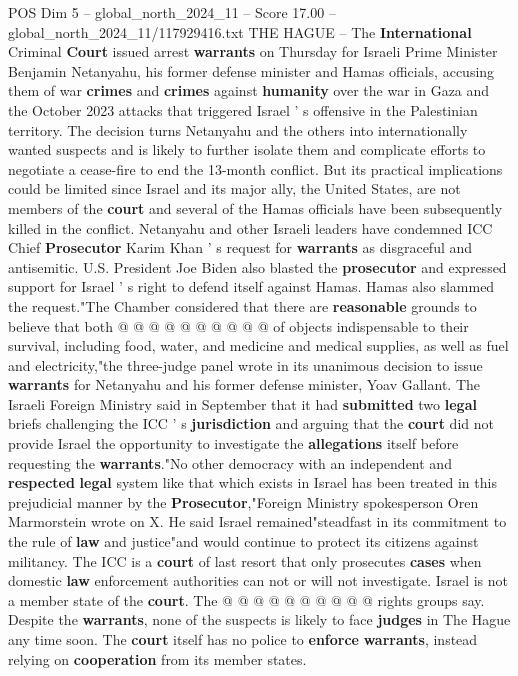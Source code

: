 \begin{textsample}{POS Dim 5 – global\_north\_2024\_11 – Score 17.00 – global\_north\_2024\_11/117929416.txt}  \label{ex:f5_pos_039}
THE HAGUE -- The \textbf{International} Criminal \textbf{Court} issued arrest \textbf{warrants} on Thursday for Israeli Prime Minister Benjamin Netanyahu, his former defense minister and Hamas officials, accusing them of war \textbf{crimes} and \textbf{crimes} against \textbf{humanity} over the war in Gaza and the October 2023 attacks that triggered Israel ' s offensive in the Palestinian territory.
The decision turns Netanyahu and the others into internationally wanted suspects and is likely to further isolate them and complicate efforts to negotiate a cease-fire to end the 13-month conflict.
But its practical implications could be limited since Israel and its major ally, the United States, are not members of the \textbf{court} and several of the Hamas officials have been subsequently killed in the conflict.
Netanyahu and other Israeli leaders have condemned ICC Chief \textbf{Prosecutor} Karim Khan ' s request for \textbf{warrants} as disgraceful and antisemitic.
U.S.
President Joe Biden also blasted the \textbf{prosecutor} and expressed support for Israel ' s right to defend itself against Hamas.
Hamas also slammed the request."The Chamber considered that there are \textbf{reasonable} grounds to believe that both @ @ @ @ @ @ @ @ @ @ of objects indispensable to their survival, including food, water, and medicine and medical supplies, as well as fuel and electricity,"the three-judge panel wrote in its unanimous decision to issue \textbf{warrants} for Netanyahu and his former defense minister, Yoav Gallant.
The Israeli Foreign Ministry said in September that it had \textbf{submitted} two \textbf{legal} briefs challenging the ICC ' s \textbf{jurisdiction} and arguing that the \textbf{court} did not provide Israel the opportunity to investigate the \textbf{allegations} itself before requesting the \textbf{warrants}."No other democracy with an independent and \textbf{respected} \textbf{legal} system like that which exists in Israel has been treated in this prejudicial manner by the \textbf{Prosecutor},"Foreign Ministry spokesperson Oren Marmorstein wrote on X.
He said Israel remained"steadfast in its commitment to the rule of \textbf{law} and justice"and would continue to protect its citizens against militancy.
The ICC is a \textbf{court} of last resort that only prosecutes \textbf{cases} when domestic \textbf{law} enforcement authorities can not or will not investigate.
Israel is not a member state of the \textbf{court}.
The @ @ @ @ @ @ @ @ @ @ rights groups say.
Despite the \textbf{warrants}, none of the suspects is likely to face \textbf{judges} in The Hague any time soon.
The \textbf{court} itself has no police to \textbf{enforce} \textbf{warrants}, instead relying on \textbf{cooperation} from its member states.

\end{textsample}
